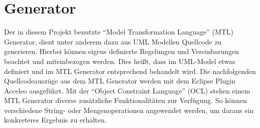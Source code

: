 \chapter{Generator}
\label{Generator}
Der in diesem Projekt benutzte “Model Transformation Language” (MTL) Generator, dient unter anderem dazu aus UML Modellen Quellcode zu generieren. Hierbei können eigens definierte Regelungen und Vereinbarungen beachtet und miteinbezogen werden. Dies heißt, dass im UML-Model etwas definiert und im MTL Generator entsprechend behandelt wird.
Die nachfolgenden Quellcodeauszüge aus dem MTL Generator werden mit dem Eclipse Plugin Acceleo ausgeführt. Mit der “Object Constraint Language” (OCL) stehen einem MTL Generator diverse zusätzliche Funktionalitäten zur Verfügung. So können verschiedene String- oder Mengenoperationen angewendet werden, um daraus ein konkreteres Ergebnis zu erhalten.




